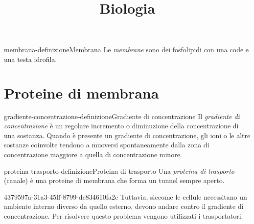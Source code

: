 \documentclass[preview]{standalone}
\begin{document}
\title{Biologia}
\genpage

\begin{snippetdefinition}{membrana-definizione}{Membrana}
    Le \textit{membrane} sono dei fosfolipidi con una code e una testa idrofila.
\end{snippetdefinition}




\section{Proteine di membrana}

\begin{snippetdefinition}{gradiente-concentrazione-definizione}{Gradiente di concentrazione}
    Il \textit{gradiente di concentrazione} è un regolare incremento o diminuzione della concentrazione di una sostanza. Quando è presente un gradiente di concentrazione, gli ioni o le altre sostanze coinvolte tendono a muoversi spontaneamente dalla zona di concentrazione maggiore a quella di concentrazione minore.
\end{snippetdefinition}


\begin{snippetdefinition}{proteina-trasporto-definizione}{Proteina di trasporto}
    Una \textit{proteina di trasporto} (canale) è una proteine di membrana che forma un tunnel sempre aperto.
\end{snippetdefinition}



\begin{snippet}{4379597a-31a3-45ff-8799-dc834610fa2c}
    Tuttavia, siccome le cellule necessitano un ambiente interno diverso da quello esterno,
devono andare contro il gradiente di concentrazione.
Per risolvere questo problema vengono utilizzati i trasportatori.
\end{snippet}
\end{document}

